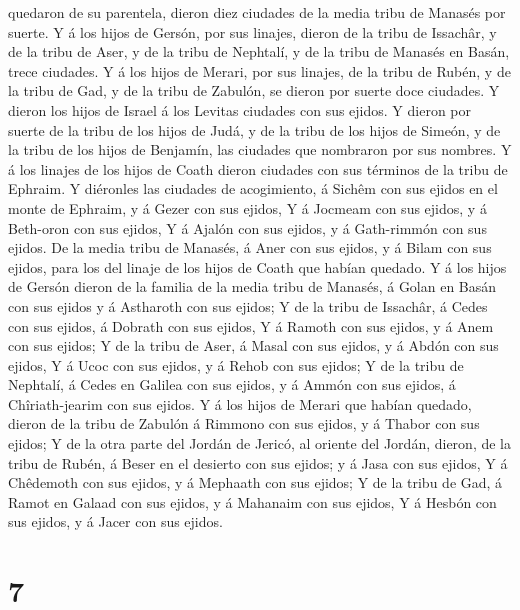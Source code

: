 quedaron de su parentela, dieron diez ciudades de la media tribu de
Manasés por suerte.  Y á los hijos de Gersón, por sus
linajes, dieron de la tribu de Issachâr, y de la tribu de Aser, y de la
tribu de Nephtalí, y de la tribu de Manasés en Basán, trece ciudades.
 Y á los hijos de Merari, por sus linajes, de la tribu de
Rubén, y de la tribu de Gad, y de la tribu de Zabulón, se dieron por
suerte doce ciudades.  Y dieron los hijos de Israel á los
Levitas ciudades con sus ejidos.  Y dieron por suerte de la
tribu de los hijos de Judá, y de la tribu de los hijos de Simeón, y de
la tribu de los hijos de Benjamín, las ciudades que nombraron por sus
nombres.  Y á los linajes de los hijos de Coath dieron
ciudades con sus términos de la tribu de Ephraim.  Y
diéronles las ciudades de acogimiento, á Sichêm con sus ejidos en el
monte de Ephraim, y á Gezer con sus ejidos,  Y á Jocmeam
con sus ejidos, y á Beth-oron con sus ejidos,  Y á Ajalón
con sus ejidos, y á Gath-rimmón con sus ejidos.  De la
media tribu de Manasés, á Aner con sus ejidos, y á Bilam con sus ejidos,
para los del linaje de los hijos de Coath que habían quedado.
 Y á los hijos de Gersón dieron de la familia de la media
tribu de Manasés, á Golan en Basán con sus ejidos y á Astharoth con sus
ejidos;  Y de la tribu de Issachâr, á Cedes con sus ejidos,
á Dobrath con sus ejidos,  Y á Ramoth con sus ejidos, y á
Anem con sus ejidos;  Y de la tribu de Aser, á Masal con
sus ejidos, y á Abdón con sus ejidos,  Y á Ucoc con sus
ejidos, y á Rehob con sus ejidos;  Y de la tribu de
Nephtalí, á Cedes en Galilea con sus ejidos, y á Ammón con sus ejidos, á
Chîriath-jearim con sus ejidos.  Y á los hijos de Merari
que habían quedado, dieron de la tribu de Zabulón á Rimmono con sus
ejidos, y á Thabor con sus ejidos;  Y de la otra parte del
Jordán de Jericó, al oriente del Jordán, dieron, de la tribu de Rubén, á
Beser en el desierto con sus ejidos; y á Jasa con sus ejidos,
 Y á Chêdemoth con sus ejidos, y á Mephaath con sus ejidos;
 Y de la tribu de Gad, á Ramot en Galaad con sus ejidos, y
á Mahanaim con sus ejidos,  Y á Hesbón con sus ejidos, y á
Jacer con sus ejidos.

\hypertarget{section-6}{%
\section{7}\label{section-6}}


